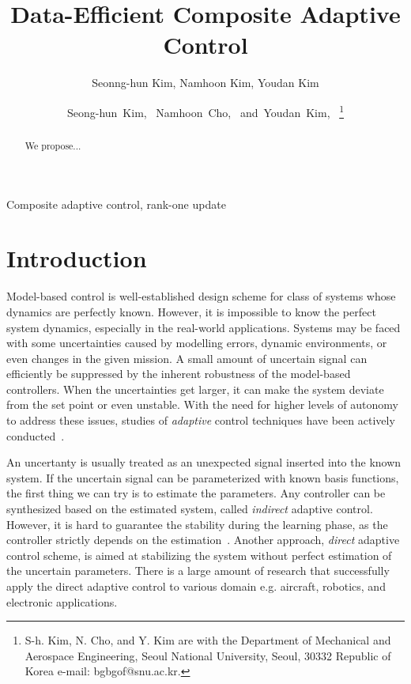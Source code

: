 \documentclass[]{IEEEtran}
\theoremstyle{definition}
\theoremstyle{remark}
\begin{document}
\title{Data-Efficient Composite Adaptive Control}
\author{Seonng-hun Kim, Namhoon Kim, Youdan Kim}
\author{Seong-hun~Kim,~
        Namhoon~Cho,~
        and~Youdan~Kim,~ %
\thanks{S-h. Kim, N. Cho, and Y. Kim are with the Department
of Mechanical and Aerospace Engineering, Seoul National University, Seoul,
30332 Republic of Korea e-mail: bgbgof@snu.ac.kr.}}
\maketitle



\begin{abstract}
	We propose...
\end{abstract}


\begin{IEEEkeywords}
	Composite adaptive control, rank-one update
\end{IEEEkeywords}


\section{Introduction}

Model-based control is well-established design scheme for class of systems whose dynamics are perfectly known.
However, it is impossible to know the perfect system dynamics, especially in the real-world applications.
Systems may be faced with some uncertainties caused by modelling errors, dynamic environments, or even changes in the given mission.
A small amount of uncertain signal can efficiently be suppressed by the inherent robustness of the model-based controllers.
When the uncertainties get larger, it can make the system deviate from the set point or even unstable.
With the need for higher levels of autonomy to address these issues, studies of \textit{adaptive} control techniques have been actively conducted~\cite{astrom_adaptive_1987}.

An uncertanty is usually treated as an unexpected signal inserted into the known system.
If the uncertain signal can be parameterized with known basis functions, the first thing we can try is to estimate the parameters.
Any controller can be synthesized based on the estimated system, called \textit{indirect} adaptive control.
However, it is hard to guarantee the stability during the learning phase, as the controller strictly depends on the estimation~\cite{slotine_applied_1991}.
Another approach, \textit{direct} adaptive control scheme, is aimed at stabilizing the system without perfect estimation of the uncertain parameters.
There is a large amount of research that successfully apply the direct adaptive control to various domain e.g. aircraft, robotics, and electronic applications.
\end{document}
